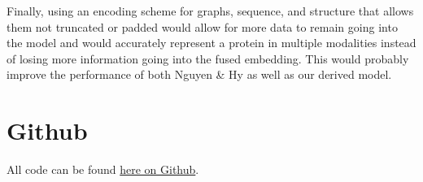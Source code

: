 \documentclass{article}
\begin{document}
Finally, using an encoding scheme for graphs, sequence, and structure that allows them not truncated or padded would allow for more data to remain going into the model and would accurately represent a protein in multiple modalities instead of losing more information going into the fused embedding. This would probably improve the performance of both Nguyen \& Hy as well as our derived model.

\section{Github}

All code can be found \hyperlink{https://github.com/kalxed/multimodal-protein-ae}{here on Github}.



\end{document}
